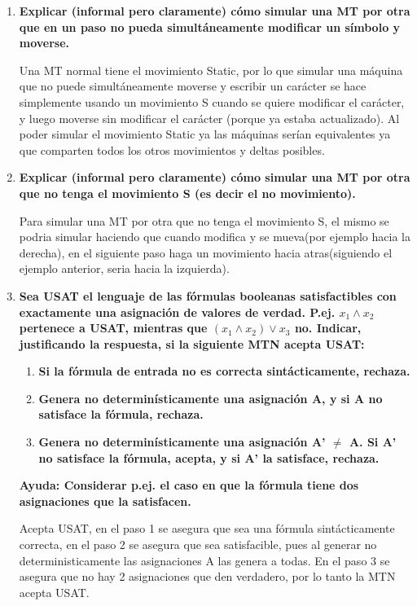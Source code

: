 \documentclass{article}
\begin{document}
\begin{enumerate}
\item \textbf{Explicar (informal pero claramente) cómo simular una MT por otra que en un paso
no pueda simultáneamente modificar un símbolo y moverse.}

Una MT normal tiene el movimiento Static, por lo que simular una máquina que no puede
simultáneamente moverse y escribir un carácter se hace simplemente usando un movimiento S cuando
se quiere modificar el carácter, y luego moverse sin modificar el carácter (porque ya estaba actualizado).
Al poder simular el movimiento Static ya las máquinas serían equivalentes ya que comparten todos los
otros movimientos y deltas posibles.

\item \textbf{Explicar (informal pero claramente) cómo simular una MT por otra que no tenga el
movimiento S (es decir el no movimiento).}

Para simular una MT por otra que no tenga el
movimiento S, el mismo se podria simular haciendo que cuando 
modifica y se mueva(por ejemplo hacia la derecha), 
en el siguiente paso haga un movimiento hacia atras(siguiendo el 
ejemplo anterior, seria hacia la izquierda).

\item \textbf{Sea USAT el lenguaje de las fórmulas booleanas satisfactibles con exactamente una
asignación de valores de verdad. P.ej. $x_1 \wedge x_2$ pertenece a USAT, mientras que $(x_1 \wedge x_2) \vee x_3$ no.
Indicar, justificando la respuesta, si la siguiente MTN acepta USAT: }

\begin{enumerate}
\item \textbf{Si la fórmula de entrada no es correcta sintácticamente, rechaza.}
\item \textbf{ Genera no determinísticamente una asignación A, y si A no satisface la fórmula, rechaza.}
\item \textbf{Genera no determinísticamente una asignación A’ $\neq$ A. Si A’ no satisface la fórmula, acepta,
y si A’ la satisface, rechaza.}
\end{enumerate}

\textbf{Ayuda: Considerar p.ej. el caso en que la fórmula tiene dos asignaciones que la satisfacen.
}


Acepta USAT, en el paso 1 se asegura que sea una fórmula sintácticamente correcta, en el paso
2 se asegura que sea satisfacible, pues al generar no deterministicamente las asignaciones A las genera
a todas. En el paso 3 se asegura que no hay 2 asignaciones que den verdadero, por lo tanto la MTN
acepta USAT.


\end{enumerate}
\end{document}
